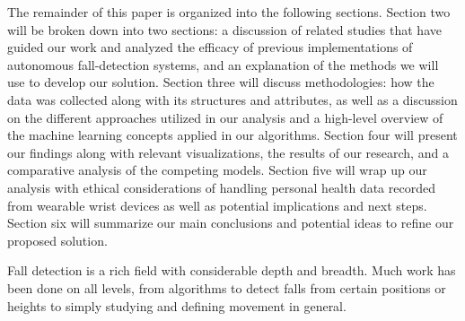 \documentclass{llncs}
\begin{document}

	The remainder of this paper is organized into the following sections. Section two will be broken down into two sections: a discussion of related studies that have guided our work and analyzed the efficacy of previous implementations of autonomous fall-detection systems, and an explanation of the methods we will use to develop our solution. Section three will discuss methodologies: how the data was collected along with its structures and attributes, as well as a discussion on the different approaches utilized in our analysis and a high-level overview of the machine learning concepts applied in our algorithms. Section four will present our findings along with relevant visualizations, the results of our research, and a comparative analysis of the competing models. Section five will wrap up our analysis with ethical considerations of handling personal health data recorded from wearable wrist devices as well as potential implications and next steps. Section six will summarize our main conclusions and potential ideas to refine our proposed solution. 

Fall detection is a rich field with considerable depth and breadth. Much work has been done on all levels, from algorithms to detect falls from certain positions or heights to simply studying and defining movement in general.
\end{document}
